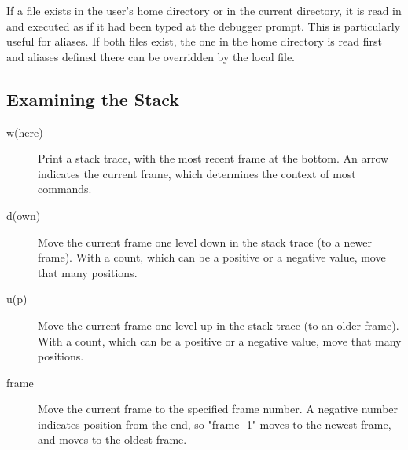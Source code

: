 If a file 
exists in the user's home directory or in the current directory, it is
read in and executed as if it had been typed at the debugger prompt.
This is particularly useful for aliases.  If both files exist, the one
in the home directory is read first and aliases defined there can be
overridden by the local file.

\subsection{Examining the Stack}

\begin{description}
\item[w(here)]

Print a stack trace, with the most recent frame at the bottom.  An
arrow indicates the current frame, which determines the context of
most commands.

\item[d(own) ]

Move the current frame one level down in the stack trace
(to a newer frame). With a count, which can be a positive
or a negative value, move that many positions.

\item[u(p) ]

Move the current frame one level up in the stack trace (to an older
frame). With a count, which can be a positive or a negative value,
move that many positions.

\item[frame ]
Move the current frame to the specified frame number. A negative
number indicates position from the end, so "frame -1" moves to 
the newest frame, and  moves to the oldest frame.

\end{description}

